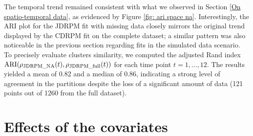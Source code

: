 \documentclass[12pt,	%
	a4paper,		%
	twoside,		%
	openright,		%
	titlepage,%
	]{book}
\theoremstyle{definition}
\begin{document}
The temporal trend remained consistent with what we observed in Section \ref{On spatio-temporal data}, as evidenced by Figure \ref{fig: ari space na}. Interestingly, the ARI plot for the JDRPM fit with missing data closely mirrors the original trend displayed by the CDRPM fit on the complete dataset; a similar pattern was also noticeable in the previous section regarding fits in the simulated data scenario. To precisely evaluate clusters similarity, we computed the adjusted Rand index $\operatorname{ARI}(\rho_\text{JDRPM\_NA}(t),\rho_\text{JDRPM\_full}(t))$ for each time point $t=1,\ldots,12$. The results yielded a mean of 0.82 and a median of 0.86, indicating a strong level of agreement in the partitions despite the loss of a significant amount of data (121 points out of 1260 from the full dataset).


\section{Effects of the covariates}
\label{Effects of the covariates}

\end{document}
